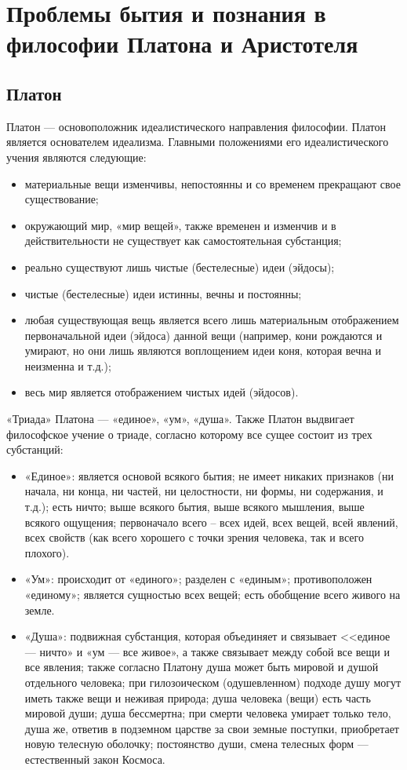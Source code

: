 \documentclass[12pt]{article}
\begin{document}
\newpage
\section{Проблемы бытия и познания в философии Платона и Аристотеля}
\subsection{Платон}
Платон --- основоположник идеалистического направления философии.
Платон  является  основателем  идеализма.  Главными  положениями  его  идеалистического  учения  являются
следующие:
\begin{itemize}
  \item материальные вещи изменчивы, непостоянны и со временем прекращают свое существование;
  \item окружающий мир, «мир вещей», также временен и изменчив и в действительности не существует как
самостоятельная субстанция;
\item реально существуют лишь чистые (бестелесные) идеи (эйдосы);
\item чистые (бестелесные) идеи истинны, вечны и постоянны;
\item любая существующая вещь является всего лишь материальным отображением первоначальной идеи (эйдоса)
данной вещи (например, кони рождаются и умирают, но они лишь являются воплощением идеи коня, которая
вечна и неизменна и т.д.);
\item весь мир является отображением чистых идей (эйдосов).
\end{itemize}
«Триада» Платона --- «единое», «ум», «душа».
Также Платон выдвигает философское учение о триаде, согласно которому все сущее состоит  из  трех
субстанций:
\begin{itemize}
  \item «Единое»:
является основой всякого бытия;
не имеет никаких признаков (ни начала, ни конца, ни частей, ни целостности, ни формы, ни содержания, и т.д.);
есть ничто;
выше всякого бытия, выше всякого мышления, выше всякого ощущения;
первоначало всего – всех идей, всех вещей, всей явлений, всех свойств (как всего хорошего с точки зрения
человека, так и всего плохого).
\item «Ум»:
происходит от «единого»; разделен с «единым»; противоположен «единому»; является сущностью всех вещей;
есть обобщение всего живого на земле.
\item «Душа»:
подвижная субстанция, которая объединяет и связывает <<единое --- ничто» и «ум --- все живое»,
а также связывает
между собой все вещи и все явления; также согласно Платону душа может быть мировой и душой отдельного
человека; при гилозоическом (одушевленном) подходе душу могут иметь также вещи и неживая природа;
душа человека (вещи) есть часть мировой души;
душа бессмертна;
при смерти человека умирает только тело, душа же, ответив в подземном царстве за свои земные поступки,
приобретает новую телесную оболочку;
постоянство души, смена телесных форм --- естественный закон Космоса.
\end{itemize}
\end{document}
